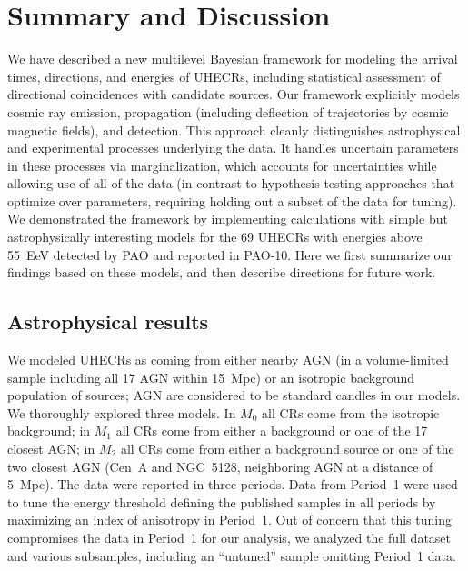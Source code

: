 \section{Summary and Discussion}
\label{sec:summary}

We have described a new multilevel Bayesian framework for modeling the
arrival times, directions, and energies of UHECRs, including statistical
assessment of directional coincidences with candidate sources.
Our framework explicitly models cosmic ray emission, propagation (including
deflection of trajectories by cosmic magnetic fields), and detection.  This
approach cleanly distinguishes astrophysical and experimental processes
underlying the data.  It handles uncertain parameters in these processes via
marginalization, which accounts for uncertainties while allowing use of all
of the data (in contrast to hypothesis testing approaches that optimize over
parameters, requiring holding out a subset of the data for tuning).
We demonstrated the framework by implementing calculations with simple but
astrophysically interesting models for the 69 UHECRs with energies above
55~EeV detected by PAO and reported in PAO-10.  Here we first summarize
our findings based on these models, and then describe directions for
future work.


\subsection{Astrophysical results}

We modeled UHECRs as coming from either nearby AGN (in a volume-limited
sample including all 17 AGN within 15~Mpc) or an isotropic background
population of sources; AGN are considered to be standard candles in
our models.  We thoroughly explored three models.  In $M_0$ all CRs come
from the isotropic background; in $M_1$ all CRs come from either a
background or one of the 17 closest AGN; in $M_2$ all CRs come from either
a background source or one of the two closest AGN (Cen~A and NGC~5128,
neighboring AGN at a distance of 5~Mpc).  The data were reported in three
periods.  Data from Period~1 were used to tune the energy threshold defining
the published samples in all periods by maximizing an index of anisotropy in
Period~1.  Out of concern that this tuning compromises the data in Period~1
for our analysis, we analyzed the full dataset and various subsamples,
including an ``untuned'' sample omitting Period~1 data.

